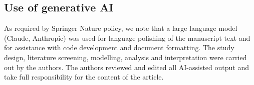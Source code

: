 \subsection{Use of generative AI}\label{sec:ai}

As required by Springer Nature policy, we note that a large language model (Claude, Anthropic) was used for language polishing of the manuscript text and for assistance with code development and document formatting. The study design, literature screening, modelling, analysis and interpretation were carried out by the authors. The authors reviewed and edited all AI-assisted output and take full responsibility for the content of the article.
